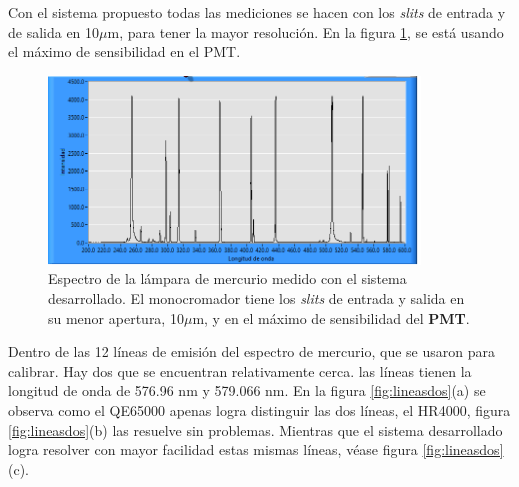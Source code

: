 Con el sistema propuesto todas las mediciones se hacen con los \textit{slits} de entrada y de salida en 10$\mu$m, para tener la mayor resolución.  En la figura \ref{fig:spectra100}, se está usando el máximo de sensibilidad en el PMT.
\begin{figure}[h!]
	\centering
	\includegraphics[width=0.9\linewidth, height=5cm]{Imagenes/4/spectra100}
	\caption{Espectro de la lámpara de mercurio medido con el sistema desarrollado. El monocromador tiene los \textit{slits} de entrada y salida en su menor apertura, 10$\mu$m, y en el máximo de sensibilidad del \textbf{PMT}.}
	\label{fig:spectra100}
\end{figure}
Dentro de las 12 líneas de emisión del espectro de mercurio, que se usaron para calibrar. Hay dos que se encuentran relativamente cerca. las líneas tienen la longitud de onda de 576.96 nm y 579.066 nm. En la figura \ref{fig:lineasdos}(a) se observa como el QE65000 apenas logra distinguir las dos líneas, el HR4000, figura \ref{fig:lineasdos}(b) las resuelve sin problemas. Mientras que el sistema desarrollado logra resolver con mayor facilidad estas mismas líneas, véase figura \ref{fig:lineasdos}(c). 

